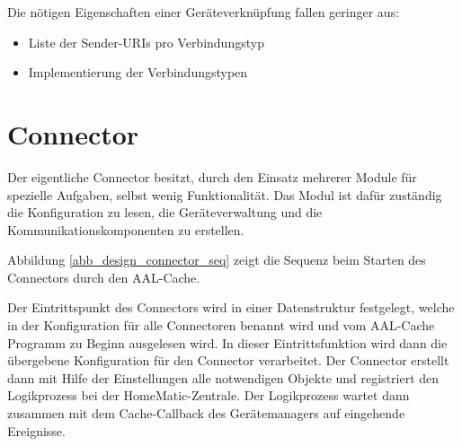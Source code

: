 Die nötigen Eigenschaften einer Geräteverknüpfung fallen geringer aus:
\begin{itemize}
\item Liste der Sender-URIs pro Verbindungstyp
\item Implementierung der Verbindungstypen
\end{itemize}

\section{Connector}
\label{des_connector}
Der eigentliche Connector besitzt, durch den Einsatz mehrerer Module für spezielle Aufgaben, selbst wenig Funktionalität.
Das Modul ist dafür zuständig die Konfiguration zu lesen, die Geräteverwaltung und die Kommunikationskomponenten
zu erstellen.

Abbildung \ref{abb_design_connector_seq} zeigt die Sequenz beim Starten des Connectors durch den AAL-Cache.

Der Eintrittspunkt des Connectors wird in einer Datenstruktur festgelegt, welche in der Konfiguration für alle
Connectoren benannt wird und vom AAL-Cache Programm zu Beginn ausgelesen wird.
In dieser Eintrittsfunktion wird dann die übergebene Konfiguration für den Connector verarbeitet.
Der Connector erstellt dann mit Hilfe der Einstellungen alle notwendigen Objekte und registriert den Logikprozess
bei der HomeMatic-Zentrale.
Der Logikprozess wartet dann zusammen mit dem Cache-Callback des Gerätemanagers auf eingehende Ereignisse.
